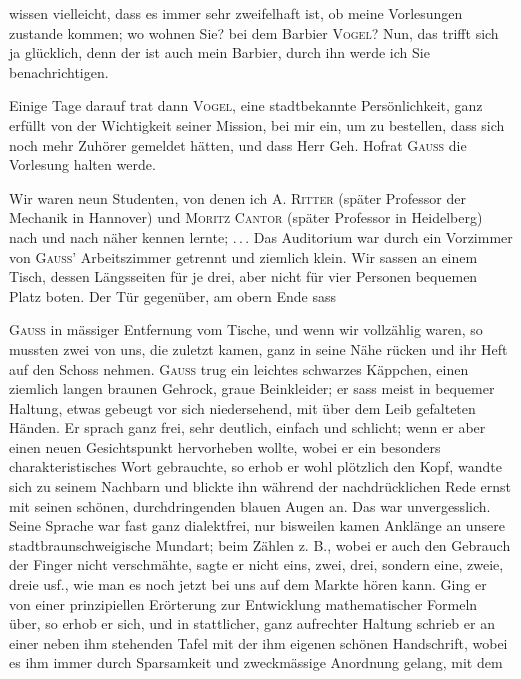 wissen vielleicht, dass es immer sehr zweifelhaft ist, ob meine Vorlesungen
zustande kommen; wo wohnen Sie? bei dem Barbier \textsc{Vogel}? Nun, das trifft
sich ja glücklich, denn der ist auch mein Barbier, durch ihn werde ich Sie
benachrichtigen.
\par
Einige Tage darauf trat dann \textsc{Vogel}, eine stadtbekannte Persönlichkeit,
ganz erfüllt von der Wichtigkeit seiner Mission, bei mir ein, um zu bestellen,
dass sich noch mehr Zuhörer gemeldet hätten, und dass Herr Geh. Hofrat
\textsc{Gauss} die Vorlesung halten werde.
\par
Wir waren neun Studenten, von denen ich \textsc{A. Ritter} (später Professor
der Mechanik in Hannover) und \textsc{Moritz Cantor} (später Professor in Heidelberg)
nach und nach näher kennen lernte; \mbox{.\,.\,.} Das Auditorium war durch
ein Vorzimmer von \textsc{Gauss'} Arbeitszimmer getrennt und ziemlich klein. Wir
sassen an einem Tisch, dessen Längsseiten für je drei, aber nicht für vier
Personen bequemen Platz boten. Der Tür gegenüber, am obern Ende sass\par
\clearpage{}
\noindent\textsc{Gauss} in mässiger Entfernung vom Tische, und wenn wir vollzählig waren,
so mussten zwei von uns, die zuletzt kamen, ganz in seine Nähe rücken und
ihr Heft auf den Schoss nehmen. \textsc{Gauss} trug ein leichtes schwarzes Käppchen,
einen ziemlich langen braunen Gehrock, graue Beinkleider; er sass
meist in bequemer Haltung, etwas gebeugt vor sich niedersehend, mit über
dem Leib gefalteten Händen. Er sprach ganz frei, sehr deutlich, einfach und
schlicht; wenn er aber einen neuen Gesichtspunkt hervorheben wollte, wobei
er ein besonders charakteristisches Wort gebrauchte, so erhob er wohl plötzlich
den Kopf, wandte sich zu seinem Nachbarn und blickte ihn während
der nachdrücklichen Rede ernst mit seinen schönen, durchdringenden blauen
Augen an. Das war unvergesslich. Seine Sprache war fast ganz dialektfrei,
nur bisweilen kamen Anklänge an unsere stadtbraunschweigische Mundart;
beim Zählen z. B., wobei er auch den Gebrauch der Finger nicht verschmähte,
sagte er nicht eins, zwei, drei, sondern eine, zweie, dreie usf., wie man es
noch jetzt bei uns auf dem Markte hören kann. Ging er von einer prinzipiellen
Erörterung zur Entwicklung mathematischer Formeln über, so erhob
er sich, und in stattlicher, ganz aufrechter Haltung schrieb er an einer neben
ihm stehenden Tafel mit der ihm eigenen schönen Handschrift, wobei es ihm
immer durch Sparsamkeit und zweckmässige Anordnung gelang, mit dem
